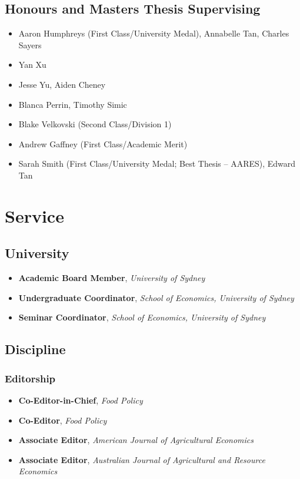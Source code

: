 \documentclass[10pt]{article}
\begin{document}
	\subsection*{Honours and Masters Thesis Supervising}	
	\begin{itemize}
		\item {} Aaron Humphreys (First Class/University Medal), Annabelle Tan, Charles Sayers
		\item {} Yan Xu
		\item {} Jesse Yu, Aiden Cheney
		\item {} Blanca Perrin, Timothy Simic
		\item {} Blake Velkovski (Second Class/Division 1)
		\item {} Andrew Gaffney (First Class/Academic Merit)
		\item {} Sarah Smith (First Class/University Medal; Best Thesis -- AARES), Edward Tan
	\end{itemize}
	
	\bigskip
	
	\section*{Service}
	
	\subsection*{University}
	\begin{itemize}
		\item {} \textbf{Academic Board Member}, \textsl{University of Sydney}
		\item {} \textbf{Undergraduate Coordinator}, \textsl{School of Economics, University of Sydney}
		\item {} \textbf{Seminar Coordinator}, \textsl{School of Economics, University of Sydney}
	\end{itemize}
	
	
	\subsection*{Discipline}
	
	\subsubsection*{Editorship}
	\begin{itemize}
		\item {} \textbf{Co-Editor-in-Chief}, \textsl{Food Policy}
		\item {} \textbf{Co-Editor}, \textsl{Food Policy}
		\item {} \textbf{Associate Editor}, \textsl{American Journal of Agricultural Economics}
		\item {} \textbf{Associate Editor}, \textsl{Australian Journal of Agricultural and Resource Economics}
	\end{itemize}
	
\end{document}
